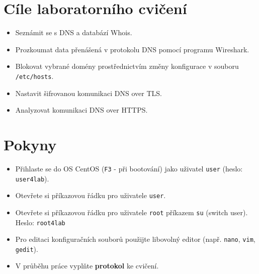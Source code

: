 \section*{Cíle laboratorního cvičení}
\begin{itemize}
  \item Seznámit se s DNS a databází Whois.
  \item Prozkoumat data přenášená v protokolu DNS pomocí programu Wireshark.
  \item Blokovat vybrané domény prostřednictvím změny konfigurace v souboru \texttt{/etc/hosts}.
  \item Nastavit šifrovanou komunikaci DNS over TLS.
  \item Analyzovat komunikaci DNS over HTTPS.
\end{itemize}

\section*{Pokyny}
\begin{itemize}
  \item Přihlaste se do OS CentOS (\texttt{F3} - při bootování) jako uživatel \texttt{user} (heslo: \texttt{user4lab}).
  \item Otevřete si příkazovou řádku pro uživatele {\tt user}.
  \item Otevřete si příkazovou řádku pro uživatele {\tt root} příkazem {\tt su} (switch user). Heslo: \texttt{root4lab}
  \item Pro editaci konfiguračních souborů použijte libovolný editor (např. \texttt{nano}, \texttt{vim}, \texttt{gedit}).
  \item V průběhu práce vyplňte \textbf{protokol} ke cvičení.
\end{itemize}

